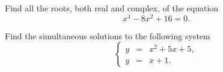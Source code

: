 \documentclass[12pt]{amsart}
\begin{document}
\newpage
\begin{thm}[18 Points]\label{ex9}
  Find all the roots, both real and complex, of the equation
  $$x^4 - 8x^2 + 16 = 0.$$
  \vspace{3in}
\end{thm}

\begin{thm}[18 Points]\label{ex9}
  Find the simultaneous solutions to the following system
  $$\left\{\begin{array}{rcl}
    y &=& x^2 + 5x + 5,\\
    y &=& x + 1.
  \end{array}\right.$$
  \vspace{2in}
\end{thm}
\end{document}
